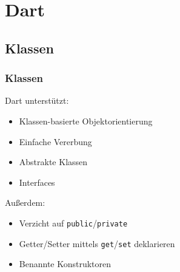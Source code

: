 \documentclass{beamer}
\begin{document}
%
%


\section{Dart}
\subsection{Klassen}
\begin{frame}[fragile]
\frametitle{Klassen}

Dart unterstützt:
\begin{itemize}
\item Klassen-basierte Objektorientierung
\pause
\item Einfache Vererbung
\pause
\item Abstrakte Klassen
\pause
\item Interfaces
\end{itemize}
\pause
Außerdem:
\begin{itemize}
\item Verzicht auf \lstinline|public|/\lstinline|private|
\item Getter/Setter mittels \lstinline|get|/\lstinline|set| deklarieren
\item Benannte Konstruktoren
\end{itemize}
%  
\end{frame}
\end{document}

